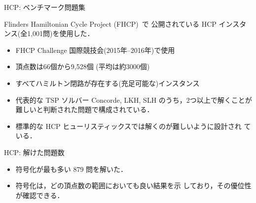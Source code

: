 \documentclass[dvipdfmx]{beamer}
\begin{document}
\begin{frame}{HCP: ベンチマーク問題集}

\begin{block}{}\centering
Flinders Hamiltonian Cycle Project (FHCP)~\footnotemark[2] で
公開されている HCP インスタンス(全1,001問)を使用した．
\end{block}
\vfill
\begin{itemize}
\item FHCP Challenge 国際競技会(2015年--2016年)で使用
\item 頂点数は66個から9,528個 (平均は約3000個)
\item すべてハミルトン閉路が存在する(充足可能な)インスタンス
\item 代表的な TSP ソルバー \textsf{Concorde}, \textsf{LKH}, \textsf{SLH}
  のうち，2つ以上で解くことが難しいと判断された問題で構成されている．
\item 標準的な HCP ヒューリスティックスでは解くのが難しいように設計され
  ている．
\end{itemize}

\end{frame}
\begin{frame}{HCP: 解けた問題数}


\begin{itemize}
\item {} 符号化が最も多い 879 問を解いた．
\item {} 符号化は，どの頂点数の範囲においても良い結果を示
  しており，その優位性が確認できる．
\end{itemize}
\end{frame}
\end{document}
